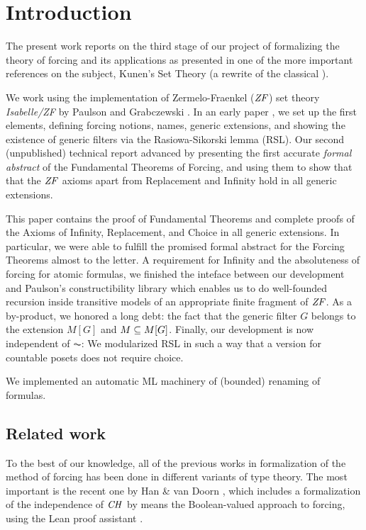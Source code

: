 \section{Introduction}
\label{sec:introduction}

The present work reports on the third stage of our project of
formalizing the theory of forcing and its applications as presented in
one of the more
important references on the subject, Kunen's Set Theory
\cite{kunen2011set} (a rewrite of the classical \cite{kunen1980}). 

We
work using the  implementation of Zermelo-Fraenkel ($\mathit{ZF}$)
set theory \emph{Isabelle/ZF} by Paulson and Grabczewski \cite{DBLP:journals/jar/PaulsonG96}. In
an early paper \cite{2018arXiv180705174G}, we set up the first
elements, defining forcing notions, names, generic extensions, and
showing the existence of generic filters via the Rasiowa-Sikorski
lemma (RSL). Our second (unpublished) technical report
\cite{2019arXiv190103313G} advanced by presenting the first accurate
\emph{formal abstract} of the Fundamental Theorems of Forcing, and
using them to show that that the $\mathit{ZF}$ axioms apart from Replacement
and Infinity hold in all generic extensions.

This paper contains the proof of Fundamental Theorems and complete
proofs of the Axioms of Infinity, Replacement, and Choice in all
generic extensions. In particular, we were able to fulfill the
promised formal abstract for the Forcing 
Theorems almost to the letter. A requirement for Infinity and the
absoluteness of forcing for atomic formulas, we finished the inteface
between our development and
Paulson's constructibility library \cite{paulson_2003} which enables
us to do well-founded
recursion inside transitive models of an appropriate finite fragment
of $\mathit{ZF}$. As a by-product, we honored a long debt: the fact that the
generic filter $G$ belongs to the extension $M[G]$ and $M\subseteq M[G]$.
Finally, our development is now independent of $\AC$: We modularized
RSL in such a way that a version for countable 
posets does not require choice.

\begin{framed}
  We implemented an automatic ML machinery of (bounded) renaming
  of formulas.
\end{framed}

\subsection{Related work}
To the best of our knowledge, all of the previous works in
formalization of the method 
of forcing has been done in different variants of type theory. The
most important is the recent one by 
Han \& van Doorn
\cite{han_et_al:LIPIcs:2019:11074,DBLP:conf/cpp/HanD20}, which includes
a formalization of the independence of $\mathit{CH}$ by means
the Boolean-valued approach to forcing, using the Lean
proof assistant \cite{DBLP:conf/cade/MouraKADR15}.

